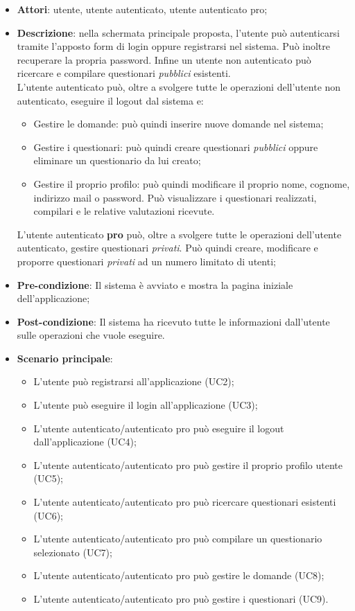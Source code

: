 \begin{itemize}
\item\textbf{Attori}: utente, utente autenticato, utente autenticato pro;
\item\textbf{Descrizione}: nella schermata principale proposta, l'utente può autenticarsi tramite l'apposto form di login oppure registrarsi nel sistema. Può inoltre recuperare la propria password. Infine un utente non autenticato può ricercare e compilare questionari \textit{pubblici} esistenti.\\
L'utente autenticato può, oltre a svolgere tutte le operazioni dell'utente non autenticato, eseguire il logout dal sistema e:
\begin{itemize}
\item Gestire le domande: può quindi inserire nuove domande nel sistema;
\item Gestire i questionari: può quindi creare questionari \textit{pubblici} oppure eliminare un questionario da lui creato;
\item Gestire il proprio profilo: può quindi modificare il proprio nome, cognome, indirizzo mail o password. Può visualizzare i questionari realizzati, compilari e le relative valutazioni ricevute.
\end{itemize}
L'utente autenticato \textbf{pro} può, oltre a svolgere tutte le operazioni dell'utente autenticato, gestire questionari \textit{privati}. Può quindi creare, modificare e proporre questionari \textit{privati} ad un numero limitato di utenti;
\item\textbf{Pre-condizione}: Il sistema è avviato e mostra la pagina iniziale dell'applicazione;
\item\textbf{Post-condizione}: Il sistema ha ricevuto tutte le informazioni dall'utente sulle operazioni che vuole eseguire.
\item\textbf{Scenario principale}:
\begin{itemize}
\item L'utente può registrarsi all'applicazione (UC2);
\item L'utente può eseguire il login all'applicazione (UC3);
\item L'utente autenticato/autenticato pro può eseguire il logout dall'applicazione (UC4); 
\item L'utente autenticato/autenticato pro può gestire il proprio profilo utente (UC5);
\item L'utente autenticato/autenticato pro può ricercare questionari esistenti (UC6);
\item L'utente autenticato/autenticato pro può compilare un questionario  selezionato (UC7);
\item L'utente autenticato/autenticato pro può gestire le domande (UC8);
\item L'utente autenticato/autenticato pro può gestire i questionari (UC9).
\end{itemize}
\end{itemize}